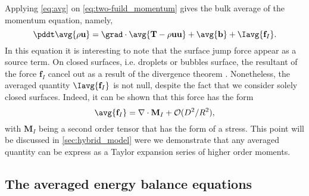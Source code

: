 Applying \ref{eq:avg} on \ref{eq:two-fuild_momentum} gives the bulk average of the momentum equation, namely,
\begin{equation}
    \pddt 
        \avg{\rho\textbf{u}}
    = \grad \cdot \avg{
        \textbf{T}
        -  \rho \textbf{u} \textbf{u}} 
    + \avg{\textbf{b}}
    + \Iavg{\textbf{f}_I}.
    \label{eq:avg_momentum}
\end{equation}
In this equation it is interesting to note that the surface jump force appear as a source term. 
On closed surfaces, i.e. droplets or bubbles surface, the resultant of the force $\textbf{f}_I$ cancel out as a result of the divergence theorem \citep{tryggvason2011direct}. 
Nonetheless, the averaged quantity $\Iavg{\textbf{f}_I}$ is not null, despite the fact that we consider solely closed surfaces.
Indeed, it can be shown that this force has the form 
\begin{equation*}
    \avg{\textbf{f}_I}
    = \nabla \cdot \textbf{M}_I + \mathcal{O}(D^2/R^2),
\end{equation*} 
with $\textbf{M}_I$ being a second order tensor that has the form of a stress. 
This point will be discussed in \ref{sec:hybrid_model} were we demonstrate that any averaged quantity can be express as a Taylor expansion series of higher order moments. 

\subsection{The averaged energy balance equations}

